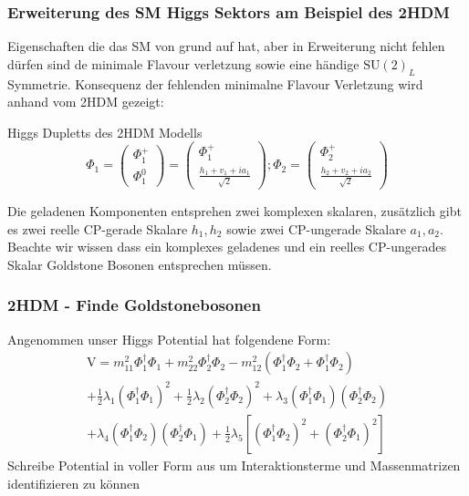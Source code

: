 \documentclass{beamer}
\begin{document}
\begin{frame}
\frametitle{Erweiterung des SM Higgs Sektors am Beispiel des 2HDM}
Eigenschaften die das SM von grund auf hat, aber in Erweiterung nicht fehlen dürfen sind de minimale Flavour verletzung sowie eine händige $\text{SU}(2)_L$ Symmetrie. Konsequenz der fehlenden minimalne Flavour Verletzung wird anhand vom 2HDM gezeigt:
\begin{block}{Higgs Dupletts des 2HDM Modells }
\begin{equation}
\Phi_{1}=\left( \begin{array}{c} \Phi^{+}_{1}\\ \Phi^{0}_{1} \end{array}\right)=\left( \begin{array}{c}\Phi^{+}_{1} \\  \frac{h_{1}+v_{1}+ia_{1}}{\sqrt{2}}\end{array}\right) ; \Phi_{2}=\left( \begin{array}{c}\Phi^{+}_{2} \\  \frac{h_{2}+v_{2}+ia_{2}}{\sqrt{2}} \end{array}\right) 
\end{equation}
\end{block}
Die geladenen Komponenten entsprehen zwei komplexen skalaren, zusätzlich gibt es zwei reelle CP-gerade Skalare $h_{1},h_{2}$ sowie zwei CP-ungerade Skalare $a_{1},a_{2}$. Beachte wir wissen dass ein komplexes geladenes und ein reelles CP-ungerades Skalar Goldstone Bosonen entsprechen müssen.
\end{frame}
\begin{frame}
\frametitle{2HDM - Finde Goldstonebosonen}
Angenommen unser Higgs Potential hat folgendene Form: 
\begin{equation}
\begin{split}
\text{V}=m_{11}^{2} \Phi_{1}^{\dagger}\Phi_{1}+m_{22}^{2} \Phi_{2}^{\dagger}\Phi_{2} -m_{12}^{2}( \Phi_{1}^{\dagger}\Phi_{2} +\Phi_{1}^{\dagger}\Phi_{2}) \\+ \frac{1}{2} \lambda_{1} (\Phi_{1}^{\dagger}\Phi_{1})^{2}+ \frac{1}{2} \lambda_{2} (\Phi_{2}^{\dagger}\Phi_{2})^{2}+ \lambda_{3}( \Phi_{1}^{\dagger}\Phi_{1})(\Phi_{2}^{\dagger}\Phi_{2} ) \\+\lambda_{4}( \Phi_{1}^{\dagger}\Phi_{2})(\Phi_{2}^{\dagger}\Phi_{1} ) +\frac{1}{2} \lambda_{5}[( \Phi_{1}^{\dagger}\Phi_{2})^{2}+(\Phi_{2}^{\dagger}\Phi_{1} )^{2}]
\end{split}
\end{equation}
Schreibe Potential in voller Form aus um Interaktionsterme und Massenmatrizen identifizieren zu können 
\end{frame}
\end{document}
